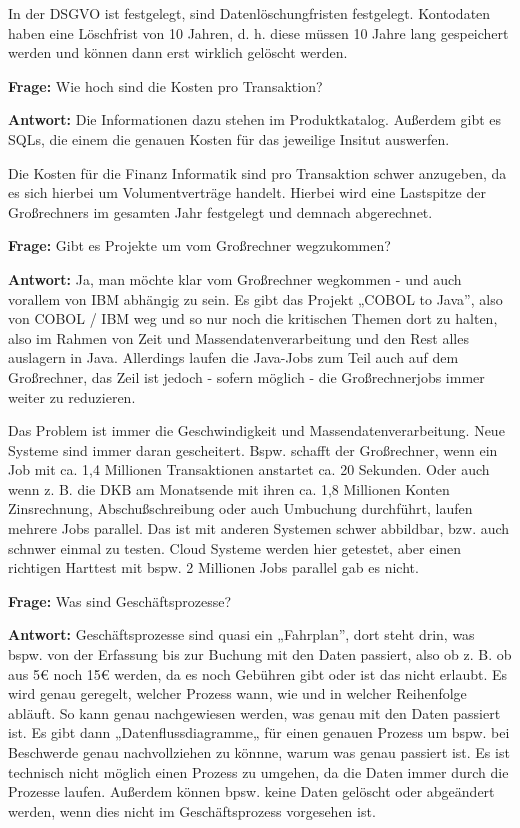 In der DSGVO ist festgelegt, sind Datenlöschungfristen festgelegt.
Kontodaten haben eine Löschfrist von 10 Jahren, d. h. diese müssen 10 Jahre lang gespeichert werden und können dann erst wirklich gelöscht werden.

\bigbreak
\bigbreak

\textbf{Frage:}
\label{i1:f3}
Wie hoch sind die Kosten pro Transaktion?


\textbf{Antwort:} 
Die Informationen dazu stehen im Produktkatalog. Außerdem gibt es SQLs, die einem die genauen Kosten für das jeweilige Insitut auswerfen.

Die Kosten für die Finanz Informatik sind pro Transaktion schwer anzugeben, da es sich hierbei um Volumentverträge handelt. 
Hierbei wird eine Lastspitze der Großrechners im gesamten Jahr festgelegt und demnach abgerechnet. 


\bigbreak
\bigbreak

\textbf{Frage:}
\label{i1:f4}
Gibt es Projekte um vom Großrechner wegzukommen?


\textbf{Antwort:}
Ja, man möchte klar vom Großrechner wegkommen - und auch vorallem von IBM abhängig zu sein.
Es gibt das Projekt „COBOL to Java”, also von COBOL / IBM weg und so nur noch die kritischen Themen dort zu halten, also im Rahmen von Zeit und Massendatenverarbeitung und den Rest alles auslagern in Java.
Allerdings laufen die Java-Jobs zum Teil auch auf dem Großrechner, das Zeil ist jedoch - sofern möglich - die Großrechnerjobs immer weiter zu reduzieren.

Das Problem ist immer die Geschwindigkeit und Massendatenverarbeitung.
Neue Systeme sind immer daran gescheitert.
Bspw. schafft der Großrechner, wenn ein Job mit ca. 1,4 Millionen Transaktionen anstartet ca. 20 Sekunden.
Oder auch wenn z. B. die DKB am Monatsende mit ihren ca. 1,8 Millionen Konten Zinsrechnung, Abschußschreibung oder auch Umbuchung durchführt, laufen mehrere Jobs parallel.
Das ist mit anderen Systemen schwer abbildbar, bzw. auch schnwer einmal zu testen.
Cloud Systeme werden hier getestet, aber einen richtigen Harttest mit bspw. 2 Millionen Jobs parallel gab es nicht.

\bigbreak
\bigbreak

\textbf{Frage:}
\label{i1:f5}
Was sind Geschäftsprozesse?


\textbf{Antwort:}
Geschäftsprozesse sind quasi ein „Fahrplan”, dort steht drin, was bspw. von der Erfassung bis zur Buchung mit den Daten passiert, also ob z. B. ob aus 5€ noch 15€ werden, da es noch Gebühren gibt oder ist das nicht erlaubt.
Es wird genau geregelt, welcher Prozess wann, wie und in welcher Reihenfolge abläuft.
So kann genau nachgewiesen werden, was genau mit den Daten passiert ist.
Es gibt dann „Datenflussdiagramme„ für einen genauen Prozess um bspw. bei Beschwerde genau nachvollziehen zu könnne, warum was genau passiert ist.
Es ist technisch nicht möglich einen Prozess zu umgehen, da die Daten immer durch die Prozesse laufen.
Außerdem können bpsw. keine Daten gelöscht oder abgeändert werden, wenn dies nicht im Geschäftsprozess vorgesehen ist.

\newpage

\bigbreak